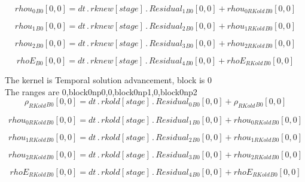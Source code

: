 \documentclass{article}
\begin{document}
\begin{dmath}{rhou_{0}{_{B0}}}[{0,0}] = dt \,.\, {rknew}[{stage}] \,.\, {Residual_{1}{_{B0}}}[{0,0}] + {rhou_{0 RKold}{_{B0}}}[{0,0}]\end{dmath}

\begin{dmath}{rhou_{1}{_{B0}}}[{0,0}] = dt \,.\, {rknew}[{stage}] \,.\, {Residual_{2}{_{B0}}}[{0,0}] + {rhou_{1 RKold}{_{B0}}}[{0,0}]\end{dmath}

\begin{dmath}{rhou_{2}{_{B0}}}[{0,0}] = dt \,.\, {rknew}[{stage}] \,.\, {Residual_{3}{_{B0}}}[{0,0}] + {rhou_{2 RKold}{_{B0}}}[{0,0}]\end{dmath}

\begin{dmath}{rhoE{_{B0}}}[{0,0}] = dt \,.\, {rknew}[{stage}] \,.\, {Residual_{4}{_{B0}}}[{0,0}] + {rhoE_{RKold}{_{B0}}}[{0,0}]\end{dmath}

\noindent The kernel is Temporal solution advancement, block is 0\\\noindent The ranges are 0,block0np0,0,block0np1,0,block0np2\\\begin{dmath}{\rho_{RKold}{_{B0}}}[{0,0}] = dt \,.\, {rkold}[{stage}] \,.\, {Residual_{0}{_{B0}}}[{0,0}] + {\rho_{RKold}{_{B0}}}[{0,0}]\end{dmath}

\begin{dmath}{rhou_{0 RKold}{_{B0}}}[{0,0}] = dt \,.\, {rkold}[{stage}] \,.\, {Residual_{1}{_{B0}}}[{0,0}] + {rhou_{0 RKold}{_{B0}}}[{0,0}]\end{dmath}

\begin{dmath}{rhou_{1 RKold}{_{B0}}}[{0,0}] = dt \,.\, {rkold}[{stage}] \,.\, {Residual_{2}{_{B0}}}[{0,0}] + {rhou_{1 RKold}{_{B0}}}[{0,0}]\end{dmath}

\begin{dmath}{rhou_{2 RKold}{_{B0}}}[{0,0}] = dt \,.\, {rkold}[{stage}] \,.\, {Residual_{3}{_{B0}}}[{0,0}] + {rhou_{2 RKold}{_{B0}}}[{0,0}]\end{dmath}

\begin{dmath}{rhoE_{RKold}{_{B0}}}[{0,0}] = dt \,.\, {rkold}[{stage}] \,.\, {Residual_{4}{_{B0}}}[{0,0}] + {rhoE_{RKold}{_{B0}}}[{0,0}]\end{dmath}
\end{document}
